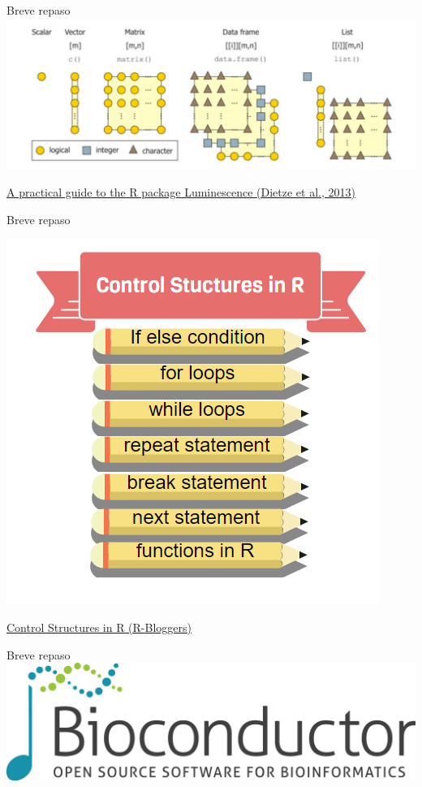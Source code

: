 \documentclass[
  ignorenonframetext,
]{beamer}
\begin{document}
\begin{frame}{Breve repaso}
\protect\hypertarget{breve-repaso}{}
\includegraphics{../../imgs/r_tipos_datos.png}

\href{https://hal.archives-ouvertes.fr/hal-01846155/document}{A
practical guide to the R package Luminescence (Dietze et al., 2013)}
\end{frame}

\begin{frame}{Breve repaso}
\protect\hypertarget{breve-repaso-1}{}
\begin{center}\includegraphics[width=0.7\linewidth]{../../imgs/control_structures+in+R} \end{center}

\href{https://www.r-bloggers.com/control-structures-loops-in-r/}{Control
Structures in R (R-Bloggers)}
\end{frame}

\begin{frame}{Breve repaso}
\protect\hypertarget{breve-repaso-2}{}
\includegraphics{../../imgs/bioconductor_logo_rgb.jpg}
\end{frame}
\end{document}
